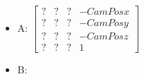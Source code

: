 \begin{itemize}

\item A:
$
\begin{bmatrix}
  ? & ? & ? & -CamPosx \\
  ? & ? & ? & -CamPosy \\
  ? & ? & ? & -CamPosz \\
  ? & ? & ? & 1
\end{bmatrix}
$
\item B:

\end{itemize}
